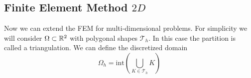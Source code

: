 \subsection{Finite Element Method \(2D\)}
Now we can extend the FEM for multi-dimensional problems. For simplicity we will consider \(\Omega \subset \mathbb{R}^2\) with polygonal shapes \(\mathcal{T}_h\). In this case the partition is called a triangulation. We can define the discretized domain 
\[
    \Omega_h = \text{int}\left(\bigcup_{K \in \mathcal{T}_h} K\right)
\]
